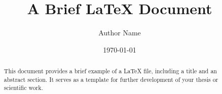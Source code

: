 \documentclass[a4paper,12pt]{article}
\title{A Brief LaTeX Document}
\author{Author Name}
\date{\today}
\begin{document}
\maketitle

\begin{abstract}
This document provides a brief example of a LaTeX file, including a title and an abstract section. It serves as a template for further development of your thesis or scientific work.
\end{abstract}
\end{document}
